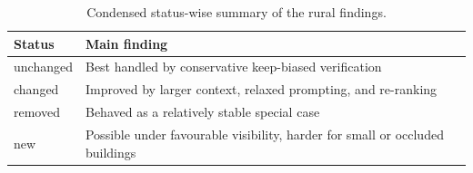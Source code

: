 \begin{table}[htbp]
\centering
\caption{Condensed status-wise summary of the rural findings.}
\label{tab:rural_status_summary}
\begin{tabular}{lp{10cm}}
\toprule
Status & Main finding \\
\midrule
unchanged & Best handled by conservative keep-biased verification \\
changed & Improved by larger context, relaxed prompting, and re-ranking \\
removed & Behaved as a relatively stable special case \\
new & Possible under favourable visibility, harder for small or occluded buildings \\
\bottomrule
\end{tabular}
\end{table}